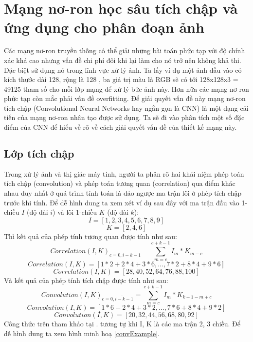 \section{Mạng nơ-ron học sâu tích chập và ứng dụng cho phân đoạn ảnh}
Các mạng nơ-ron truyền thống có thể giải những bài toán phức tạp với độ chính xác khá cao nhưng vấn đề chi phí đôi khi lại làm cho nó trở nên không khả thi. Đặc biệt sử dụng nó trong lĩnh vực xử lý ảnh. Ta lấy ví dụ một ảnh đầu vào có kích thước dài 128, rộng là 128 , ba giá trị màu là RGB sẽ có tới 128x128x3 = 49125 tham số cho mỗi lớp mạng để xử lý bức ảnh này. Hơn nữa các mạng nơ-ron phức tạp còn mắc phải vấn đề overfitting. Để giải quyết vấn đề này mạng nơ-ron tích chập (Convolutional Neural Networks hay ngắn gọn là CNN) là một dạng cải tiến của mạng nơ-ron nhân tạo được sử dụng. Ta sẽ đi vào phân tích một số đặc điểm của CNN để hiểu về rõ về cách giải quyết vấn đề của thiết kế mạng này.



\subsection{Lớp tích chập}
Trong xử lý ảnh và thị giác máy tính, người ta phân rõ hai khái niệm phép toán tích chập (convolution) và phép toán tương quan (correlation) qua điểm khác nhau duy nhất ở quá trình tính toán là đảo ngược ma trận lõi ở phép tích chập trước khi tính. Để dễ hình dung ta xem xét ví dụ sau đây với ma trận đầu vào 1-chiều $I$ (độ dài $i$) và lõi 1-chiều $K$ (độ dài $k$):
$$ I = [1, 2, 3, 4, 5, 6, 7, 8, 9]$$
$$ K = [2, 4, 6] $$
Thì kết quả của phép tính tương quan được tính như sau:
$$ Correlation(I,K)_{c = \overline{0, i - k - 1}} = \sum_{m=c}^{c + k-1}I_{m}*K_{m-c}$$
$$ Correlation(I,K) = [1*2 + 2*4 + 3*6, ... , 7*2 + 8*4 + 9*6] $$
$$ Correlation(I,K) = [28,  40,  52,  64,  76,  88, 100] $$
Và kết quả của phép tính tích chập được tính như sau:
$$ Convolution(I,K)_{c = \overline{0, i - k - 1}} = \sum_{m=c}^{c + k-1}I_{m}*K_{k - 1 - m + c}$$
$$ Convolution(I,K) = [1*6 + 2*4 + 3*2, ... , 7*6 + 8*4 + 9*2] $$
$$ Convolution(I,K) = [20, 32, 44, 56, 68, 80, 92] $$
Công thức trên tham khảo tại \cite{convSlide}. tương tự khi I, K là các ma trận 2, 3 chiều. Để dễ hình dung ta xem hình minh hoạ \ref{convExample}.

